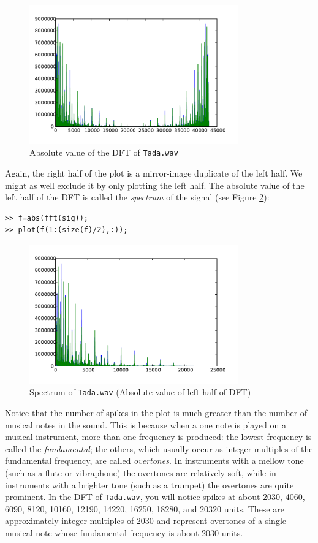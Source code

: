 \begin{figure}[ht]\caption{Absolute value of the DFT of \texttt{Tada.wav}}\label{tadaspec}\centering\includegraphics[width=90mm]{tadaspec}\end{figure}
Again, the right half of the plot is a mirror-image duplicate of the left half. We might as well exclude it by only plotting the left half. The absolute value of the left half of  the DFT is called the \emph{spectrum} of the signal (see Figure \ref{tadaspec2}):
\begin{verbatim}
>> f=abs(fft(sig));
>> plot(f(1:(size(f)/2),:));
\end{verbatim}
\begin{figure}[ht]\caption{Spectrum of \texttt{Tada.wav} (Absolute value of left half of DFT)}\label{tadaspec2}\centering\includegraphics[width=90mm]{tadaspec2}\end{figure}
Notice that the number of spikes in the plot is much greater than the number of musical notes in the sound. This is because when a one note is played on a musical instrument, more than one frequency is produced: the lowest frequency is called the \emph{fundamental}; the others, which usually occur as integer multiples of the fundamental frequency, are called \emph{overtones}. In instruments with a mellow tone (such as a flute or vibraphone) the overtones are relatively soft, while in instruments with a brighter tone (such as a trumpet) the overtones are quite prominent. In the DFT of \texttt{Tada.wav}, you will notice spikes at about 2030, 4060, 6090, 8120, 10160, 12190, 14220, 16250, 18280, and 20320 units. These are approximately integer multiples of 2030 and represent overtones of a single musical note whose fundamental frequency is about 2030 units.

